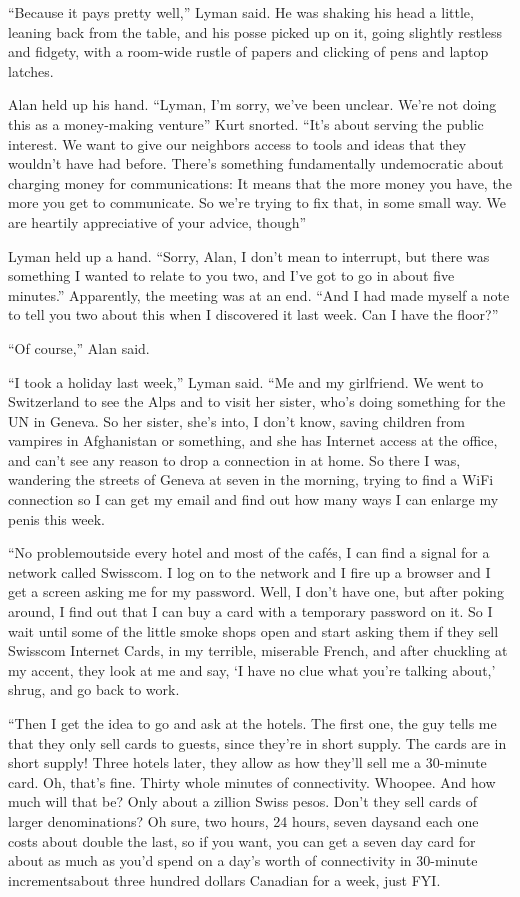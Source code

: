 ``Because it pays pretty well,'' Lyman said.  He was shaking his head
a little, leaning back from the table, and his posse picked up on it,
going slightly restless and fidgety, with a room-wide rustle of papers
and clicking of pens and laptop latches.

Alan held up his hand.  ``Lyman, I'm sorry, we've been unclear.  We're
not doing this as a money-making venture\dash{}'' Kurt snorted.  ``It's
about serving the public interest.  We want to give our neighbors
access to tools and ideas that they wouldn't have had before.  There's
something fundamentally undemocratic about charging money for
communications:  It means that the more money you have, the more you
get to communicate.  So we're trying to fix that, in some small way. 
We are heartily appreciative of your advice, though\dash{}''

Lyman held up a hand.  ``Sorry, Alan, I don't mean to interrupt, but
there was something I wanted to relate to you two, and I've got to go
in about five minutes.'' Apparently, the meeting was at an end.  ``And
I had made myself a note to tell you two about this when I discovered
it last week.  Can I have the floor?''

``Of course,'' Alan said.

``I took a holiday last week,'' Lyman said.  ``Me and my girlfriend. 
We went to Switzerland to see the Alps and to visit her sister, who's
doing something for the UN in Geneva.  So her sister, she's into, I
don't know, saving children from vampires in Afghanistan or something,
and she has Internet access at the office, and can't see any reason to
drop a connection in at home.  So there I was, wandering the streets
of Geneva at seven in the morning, trying to find a WiFi connection so
I can get my email and find out how many ways I can enlarge my penis
this week.

``No problem\dash{}outside every hotel and most of the caf\'{e}s, I can
find a signal for a network called Swisscom.  I log on to the network
and I fire up a browser and I get a screen asking me for my password. 
Well, I don't have one, but after poking around, I find out that I can
buy a card with a temporary password on it.  So I wait until some of
the little smoke shops open and start asking them if they sell
Swisscom Internet Cards, in my terrible, miserable French, and after
chuckling at my accent, they look at me and say, `I have no clue what
you're talking about,' shrug, and go back to work.

``Then I get the idea to go and ask at the hotels.  The first one, the
guy tells me that they only sell cards to guests, since they're in
short supply.  The cards are in short supply!  Three hotels later,
they allow as how they'll sell me a 30-minute card.  Oh, that's fine. 
Thirty whole minutes of connectivity.  Whoopee.  And how much will
that be?  Only about a zillion Swiss pesos.  Don't they sell cards of
larger denominations?  Oh sure, two hours, 24 hours, seven days\dash{}and
each one costs about double the last, so if you want, you can get a
seven day card for about as much as you'd spend on a day's worth of
connectivity in 30-minute increments\dash{}about three hundred dollars
Canadian for a week, just FYI.

